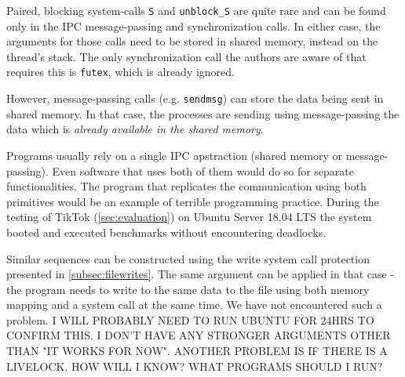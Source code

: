 Paired, blocking system-calls \texttt{S} and \texttt{unblock\_S} are quite rare
and can be found only in the IPC message-passing and synchronization calls. In
either case, the arguments for those calls need to be stored in shared memory,
instead on the thread's stack. The only synchronization call the authors are
aware of that requires this is \texttt{futex}, which is already ignored.

However, message-passing calls (e.g. \texttt{sendmsg}) can store the data being
sent in shared memory. In that case, the processes are sending using
message-passing the data which is \emph{already available in the shared memory}.





Programs usually rely on a single IPC apstraction (shared memory or
message-passing). Even software that uses both of them would do so for separate
functionalities. The program that replicates the communication using both
primitives would be an example of terrible programming practice. During the
testing of TikTok (\cref{sec:evaluation}) on Ubuntu Server 18.04 LTS the system
booted and executed benchmarks without encountering deadlocks.

Similar sequences can be constructed using the write system call protection
presented in \cref{subsec:filewrites}. The same argument can be applied in that
case - the program needs to write to the same data to the file using both memory
mapping and a system call at the same time. We have not encountered such a
problem. I WILL PROBABLY NEED TO RUN UBUNTU FOR 24HRS TO CONFIRM THIS. I DON'T HAVE
ANY STRONGER ARGUMENTS OTHER THAN "IT WORKS FOR NOW". ANOTHER PROBLEM IS IF THERE IS
A LIVELOCK. HOW WILL I KNOW? WHAT PROGRAMS SHOULD I RUN?

